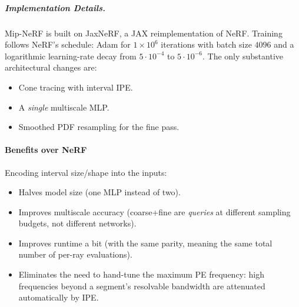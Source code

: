 \begin{enrichment}
\begin{enrichment}
    \subparagraph{Implementation Details.}
    Mip-NeRF is built on JaxNeRF, a JAX reimplementation of NeRF. Training follows NeRF’s schedule: Adam for $1\!\times\!10^6$ iterations with batch size $4096$ and a logarithmic learning-rate decay from $5\cdot10^{-4}$ to $5\cdot10^{-6}$. The only substantive architectural changes are: 
    \begin{itemize}
        \item Cone tracing with interval IPE.
        \item A \emph{single} multiscale MLP. 
        \item Smoothed PDF resampling for the fine pass.
    \end{itemize}
    
    \paragraph{Benefits over NeRF}
    Encoding interval size/shape into the inputs:
    \begin{itemize}
        \item Halves model size (one MLP instead of two).
        \item Improves multiscale accuracy (coarse+fine are \emph{queries} at different sampling budgets, not different networks).
        \item Improves runtime a bit (with the same parity, meaning the same total number of per-ray evaluations).
        \item Eliminates the need to hand-tune the maximum PE frequency: high frequencies beyond a segment’s resolvable bandwidth are attenuated automatically by IPE.
    \end{itemize}
    

\end{enrichment}
\end{enrichment}
